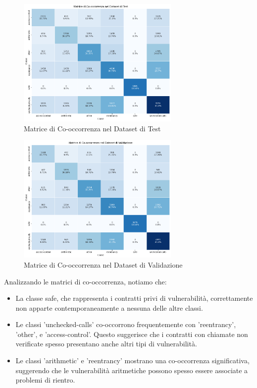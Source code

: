\documentclass[../../Thesis.tex]{subfiles}
\begin{document}
\begin{figure}[H]
    \centering
    \includegraphics[width=0.7\textwidth]{../../img/TestCo-occurrency.png}
    \caption{Matrice di Co-occorrenza nel Dataset di Test}
    \label{fig:test_cooccurrence_matrix}
\end{figure}

\begin{figure}[h]
    \centering
    \includegraphics[width=0.7\textwidth]{../../img/ValCo-occurrency.png}
    \caption{Matrice di Co-occorrenza nel Dataset di Validazione}
    \label{fig:val_cooccurrence_matrix}
\end{figure}



Analizzando le matrici di co-occorrenza, notiamo che:

\begin{itemize}
    \item La classe safe, che rappresenta i contratti privi di vulnerabilità, correttamente non apparte contemporaneamente a nessuna delle altre classi. 
    \item Le classi 'unchecked-calls' co-occorrono frequentemente con 'reentrancy', 'other', e 'access-control'. Questo suggerisce che i contratti con chiamate non verificate spesso presentano anche altri tipi di vulnerabilità.
    \item Le classi 'arithmetic' e 'reentrancy' mostrano una co-occorrenza significativa, suggerendo che le vulnerabilità aritmetiche possono spesso essere associate a problemi di rientro.
\end{itemize}
\end{document}

